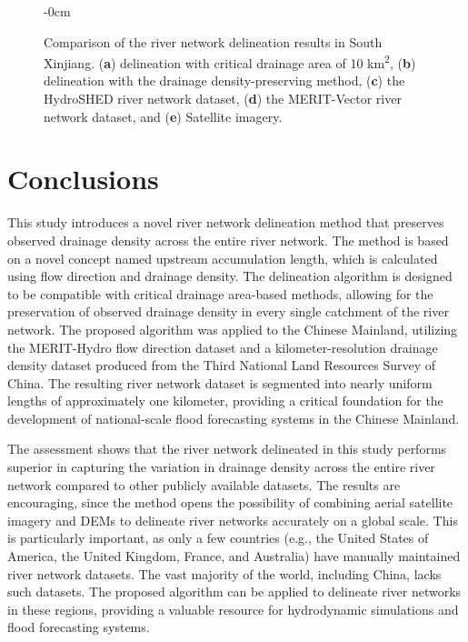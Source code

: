 \documentclass[water,article,submit,pdftex,moreauthors]{Definitions/mdpi}
\begin{document}
\begin{figure}[H]
\begin{adjustwidth}{-\extralength}{0cm}
  \end{adjustwidth}
  \caption{Comparison of the river network delineation results in South Xinjiang. (\textbf{a}) delineation with critical drainage area of 10 km\textsuperscript{2}, (\textbf{b}) delineation with the drainage density-preserving method, (\textbf{c}) the HydroSHED river network dataset, (\textbf{d}) the MERIT-Vector river network dataset, and (\textbf{e}) Satellite imagery.\label{fig:comparison}}
\end{figure}

\section{Conclusions}
\label{sec:conclusion}

This study introduces a novel river network delineation method that preserves observed drainage density across the entire river network. The method is based on a novel concept named upstream accumulation length, which is calculated using flow direction and drainage density. The delineation algorithm is designed to be compatible with critical drainage area-based methods, allowing for the preservation of observed drainage density in every single catchment of the river network. The proposed algorithm was applied to the Chinese Mainland, utilizing the MERIT-Hydro flow direction dataset and a kilometer-resolution drainage density dataset produced from the Third National Land Resources Survey of China. The resulting river network dataset is segmented into nearly uniform lengths of approximately one kilometer, providing a critical foundation for the development of national-scale flood forecasting systems in the Chinese Mainland.

The assessment shows that the river network delineated in this study performs superior in capturing the variation in drainage density across the entire river network compared to other publicly available datasets. The results are encouraging, since the method opens the possibility of combining aerial satellite imagery and DEMs to delineate river networks accurately on a global scale. This is particularly important, as only a few countries (e.g., the United States of America, the United Kingdom, France, and Australia) have manually maintained river network datasets. The vast majority of the world, including China, lacks such datasets. The proposed algorithm can be applied to delineate river networks in these regions, providing a valuable resource for hydrodynamic simulations and flood forecasting systems.
\end{document}
